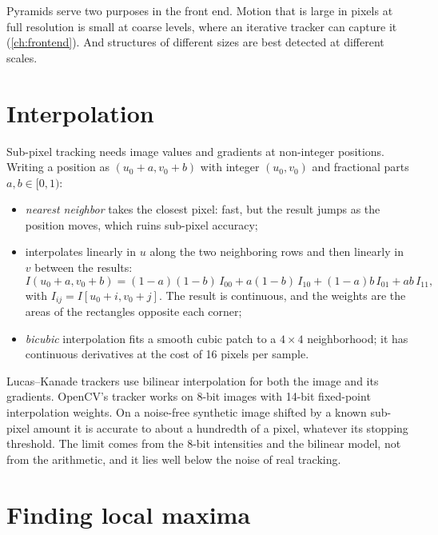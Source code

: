 Pyramids serve two purposes in the front end. Motion that is large in pixels at full resolution is small at coarse levels, where an iterative tracker can
capture it (\cref{ch:frontend}). And structures of different sizes are best detected at different scales.

\section{Interpolation}
\label{sec:interpolation}

Sub-pixel tracking needs image values and gradients at non-integer positions. Writing a position as $(u_0 + a, v_0 + b)$ with integer $(u_0, v_0)$ and fractional parts
$a, b \in [0, 1)$:
\begin{itemize}
  \item \emph{nearest neighbor} takes the closest pixel: fast, but the result jumps as the position moves, which ruins sub-pixel accuracy;
  \item {} interpolates linearly in $u$ along the two neighboring rows and then linearly in $v$ between the results:
  \begin{equation}
    I(u_0 + a, v_0 + b) = (1 - a)(1 - b)\,I_{00} + a(1 - b)\,I_{10} + (1 - a)b\,I_{01} + ab\,I_{11},
  \end{equation}
  with $I_{ij} = I[u_0 + i, v_0 + j]$. The result is continuous, and the weights are the areas of the rectangles opposite each corner;
  \item \emph{bicubic} interpolation fits a smooth cubic patch to a $4\times4$ neighborhood; it has continuous derivatives at the cost of 16 pixels per sample.
\end{itemize}
Lucas--Kanade trackers use bilinear interpolation for both the image and its gradients. OpenCV's tracker works on 8-bit images with 14-bit fixed-point
interpolation weights. On a noise-free synthetic image shifted by a known sub-pixel amount it is accurate to about a hundredth of a pixel, whatever its stopping
threshold. The limit comes from the 8-bit intensities and the bilinear model, not from the arithmetic, and it lies well below the noise of real tracking.

\section{Finding local maxima}

